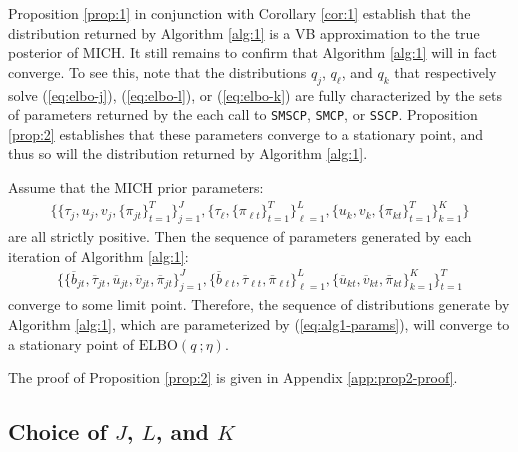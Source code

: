 Proposition \ref{prop:1} in conjunction with Corollary \ref{cor:1} establish that the distribution returned by Algorithm \ref{alg:1} is a VB approximation to the true posterior of MICH. It still remains to confirm that Algorithm \ref{alg:1} will in fact converge. To see this, note that the distributions $q_j$, $q_\ell$, and $q_k$ that respectively solve (\ref{eq:elbo-j}), (\ref{eq:elbo-l}), or (\ref{eq:elbo-k}) are fully characterized by the sets of parameters returned by the each call to \texttt{SMSCP}, \texttt{SMCP}, or \texttt{SSCP}. Proposition \ref{prop:2} establishes that these parameters converge to a stationary point, and thus so will the distribution returned by Algorithm \ref{alg:1}. 
\begin{proposition}
\label{prop:2}
Assume that the MICH prior parameters: 
\begin{align*}
    \{\{\tau_j, u_j, v_j, \{\pi_{jt}\}_{t=1}^T\}_{j=1}^J, \{\tau_\ell,  \{\pi_{\ell t}\}_{t=1}^T\}_{\ell=1}^L, \{u_k, v_k, \{\pi_{kt}\}_{t=1}^T\}_{k=1}^K\}
\end{align*}
are all strictly positive. Then the sequence of parameters generated by each iteration of Algorithm \ref{alg:1}: 
\begin{align}\label{eq:alg1-params}
    \{\{\overline{b}_{jt}, \overline{\tau}_{jt}, \overline{u}_{jt}, \overline{v}_{jt}, \overline{\pi}_{jt}\}_{j=1}^J, \{\overline{b}_{\ell t}, \overline{\tau}_{\ell t}, \overline{\pi}_{\ell t}\}_{\ell=1}^L, \{\overline{u}_{kt}, \overline{v}_{kt}, \overline{\pi}_{kt}\}_{k=1}^K\}_{t=1}^T
\end{align}
converge to some limit point. Therefore, the sequence of distributions generate by Algorithm \ref{alg:1}, which are parameterized by (\ref{eq:alg1-params}), will converge to a stationary point of $\text{ELBO}(q\:;\eta)$.
\end{proposition}
The proof of Proposition \ref{prop:2} is given in Appendix \ref{app:prop2-proof}.

\subsection{Choice of \texorpdfstring{$J$}{J}, \texorpdfstring{$L$}{L}, and \texorpdfstring{$K$}{K}}